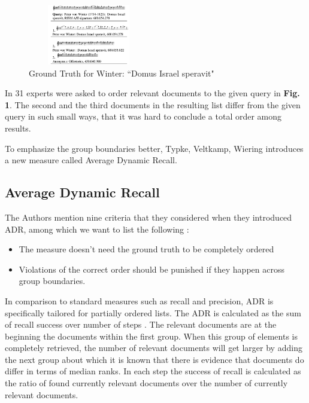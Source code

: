 \documentclass{llncs}
\begin{document}
\begin{itemize}
 		\begin{figure}[h!]
			\centering
			\includegraphics[width=200px,height=100px,keepaspectratio]{one_of_two_point_four_point_four}
			\caption{Ground Truth for Winter: “Domus Israel speravit" \cite{two_point_four_point_four}}
		\end{figure}


 		 In \cite{two_point_four_point_four} 31 experts were asked to order relevant documents to the given query in \textbf{Fig. 1}. The second and the third documents in the resulting list differ from the given query in such small ways, that it was hard to conclude a total order among results.

 		To emphasize the group boundaries better, Typke, Veltkamp, Wiering \cite{three} introduces a new measure called Average Dynamic Recall. 

		\subsection{Average Dynamic Recall}
			
			The Authors mention nine criteria that they considered when they introduced ADR, among which we want to list the following :

			\begin{itemize}
				\item The measure doesn't need the ground truth to be completely ordered
				\item Violations of the correct order should be punished if they happen across group boundaries.
			\end{itemize}

			In comparison to standard measures such as recall and precision, ADR is specifically tailored for partially ordered lists.
			The ADR is calculated as the sum of recall success over number of steps . The relevant documents are at the beginning the  documents within the first group. When this group of elements is completely retrieved, the number of relevant documents will get larger by adding the next group about which it is known that there is evidence that documents do differ in terms of median ranks. In each step the success of recall is calculated as the ratio of found currently relevant documents over the number of currently relevant documents.


\end{itemize}
\end{document}

